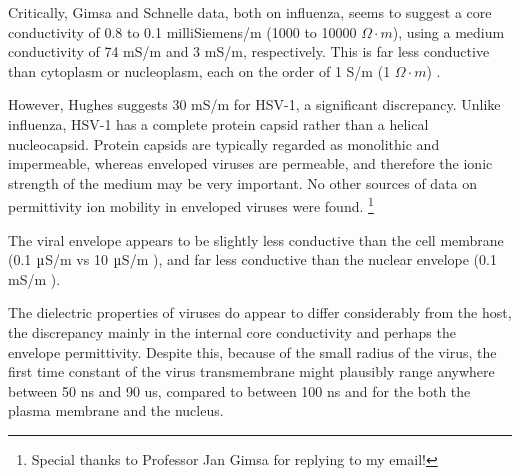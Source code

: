 \documentclass[fleqn,10pt]{paper}
\begin{document}
Critically, Gimsa and Schnelle data, both on influenza, seems to suggest a core conductivity of 0.8 to 0.1 milliSiemens/m (1000 to 10000 $\Omega \cdot m$), using a medium conductivity of 74 mS/m and 3 mS/m, respectively. This is far less conductive than cytoplasm or nucleoplasm, each on the order of 1 S/m (1 $\Omega \cdot m$) \cite{Study2001}. 



However, Hughes suggests 30 mS/m for HSV-1, a significant discrepancy. Unlike influenza, HSV-1 has a complete protein capsid rather than a helical nucleocapsid. Protein capsids are typically regarded as monolithic and impermeable, whereas enveloped viruses are permeable, and therefore the ionic strength of the medium may be very important. No other sources of data on permittivity ion mobility in enveloped viruses were found.  \footnote{Special thanks to Professor Jan Gimsa for replying to my email!}

The viral envelope appears to be slightly less conductive than the cell membrane (0.1 $\micro$S/m \cite{New1999} vs 10 $\micro$S/m \cite{Study2001}), and far less conductive than the nuclear envelope (0.1 $\text{m}$S/m \cite{Study2001}).


The dielectric properties of viruses do appear to differ considerably from the host, the discrepancy mainly in the internal core conductivity and perhaps the envelope permittivity. Despite this, because of the small radius of the virus, the first time constant of the virus transmembrane might plausibly range anywhere between 50 ns and 90 us, compared to between 100 ns and  for the both the plasma membrane and the nucleus.

\end{document}
